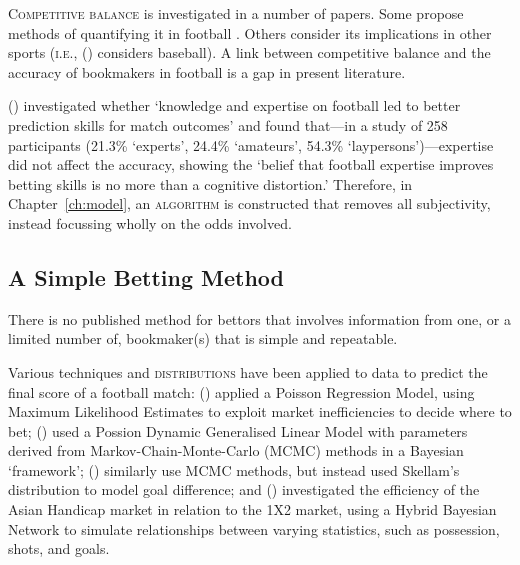\documentclass[a4paper,10pt]{report}
\begin{document}
\textsc{Competitive balance} is investigated in a number of papers. Some propose methods of quantifying it in football \parencite{Goossens05, ramchandani12}. Others consider its implications in other sports (\textsc{i.e.}, \citeauthor{Rottenberg56} (\citeyear{Rottenberg56}) considers baseball). A link between competitive balance and the accuracy of bookmakers in football is a gap in present literature. \vspace{3mm}

\citeauthor{khazaal12} (\citeyear{khazaal12}) investigated whether `knowledge and expertise on football led to better prediction skills for match outcomes' and found that---in a study of 258 participants (21.3\% `experts’, 24.4\% `amateurs’, 54.3\% `laypersons’)---expertise did not affect the accuracy, showing the `belief that football expertise improves betting skills is no more than a cognitive distortion.' Therefore, in Chapter~\ref{ch:model}, an \textsc{algorithm} is constructed that removes all subjectivity, instead focussing wholly on the odds involved. 

\subsection*{A Simple Betting Method}
There is no published method for bettors that involves information from one, or a limited number of, bookmaker(s) that is simple and repeatable. \vspace{3mm}

Various techniques and \textsc{distributions} have been applied to data to predict the final score of a football match: \citeauthor{dixon97} (\citeyear{dixon97}) applied a Poisson Regression Model, using Maximum Likelihood Estimates to exploit market inefficiencies to decide where to bet; \citeauthor{Owen09} (\citeyear{Owen09}) used a Possion Dynamic Generalised Linear Model with parameters derived from Markov-Chain-Monte-Carlo (MCMC) methods in a Bayesian ‘framework’; \citeauthor{karlis09} (\citeyear{karlis09}) similarly use MCMC methods, but instead used Skellam’s distribution to model goal difference; and \citeauthor{constantinou20} (\citeyear{constantinou20}) investigated the efficiency of the Asian Handicap market in relation to the 1X2 market, using a Hybrid Bayesian Network to simulate relationships between varying statistics, such as possession, shots, and goals.
\vspace{3mm}
\end{document}
